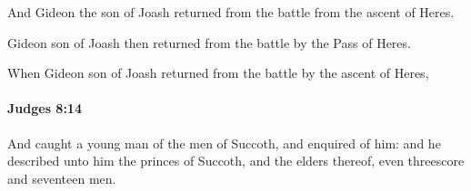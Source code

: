 			\begin{versebox}
					\item[BHS] 
					\item[ASV] And Gideon the son of Joash returned from the battle from the ascent of Heres.
					\item[NIV] Gideon son of Joash then returned from the battle by the Pass of Heres.
					\item[NRSV] When Gideon son of Joash returned from the battle by the ascent of Heres,
			\end{versebox}

		\paragraph{Judges 8:14} %
			\label{JUDGES-8-14}

			And caught a young man of the men of Succoth, and enquired of him: and he described unto him the princes of Succoth, and the elders thereof, even threescore and seventeen men.

